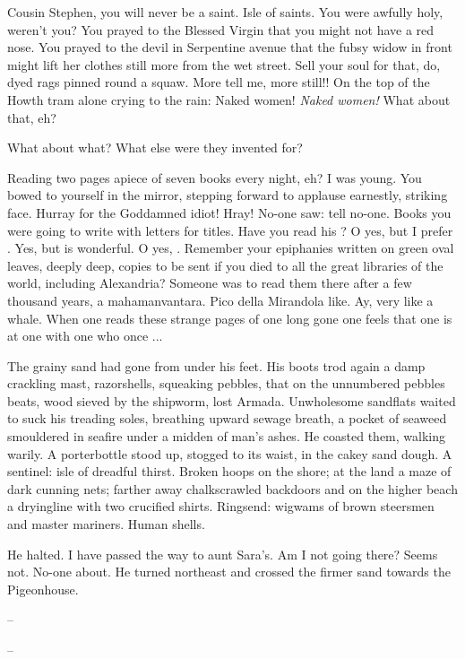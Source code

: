 Cousin Stephen, you will never be a saint.
Isle of saints.
You were awfully holy, weren't you?
You prayed to the Blessed Virgin
that you might not have a red nose.
You prayed to the devil in Serpentine avenue
that the fubsy widow in front might lift her clothes
still more from the wet street.
Sell your soul for that, do, dyed rags pinned round a squaw.
More tell me, more still!!
On the top of the Howth tram alone crying to the rain:
Naked women!
\emph{Naked women!}
What about that, eh?

What about what?
What else were they invented for?

Reading two pages apiece of seven books every night, eh?
I was young.
You bowed to yourself in the mirror,
stepping forward to applause earnestly, striking face.
Hurray for the Goddamned idiot!
Hray!
No-one saw:
tell no-one.
Books you were going to write with letters for titles.
Have you read his ?
O yes, but I prefer .
Yes, but  is wonderful.
O yes, .
Remember your epiphanies written on green oval leaves,
deeply deep,
copies to be sent if you died to all the great libraries of the world,
including Alexandria?
Someone was to read them there after a few thousand years,
a mahamanvantara.
Pico della Mirandola like.
Ay, very like a whale.
When one reads these strange pages of one long gone
one feels that one is at one with one who once ...

The grainy sand had gone from under his feet.
His boots trod again a damp crackling mast,
razorshells, squeaking pebbles,
that on the unnumbered pebbles beats,
wood sieved by the shipworm,
lost Armada.
Unwholesome sandflats waited to suck his treading soles,
breathing upward sewage breath,
a pocket of seaweed smouldered in seafire under a midden of man's ashes.
He coasted them, walking warily.
A porterbottle stood up,
stogged to its waist, in the cakey sand dough.
A sentinel:
isle of dreadful thirst.
Broken hoops on the shore;
at the land a maze of dark cunning nets;
farther away chalkscrawled backdoors
and on the higher beach
a dryingline with two crucified shirts.
Ringsend:
wigwams of brown steersmen and master mariners.
Human shells.

He halted.
I have passed the way to aunt Sara's.
Am I not going there?
Seems not.
No-one about.
He turned northeast and crossed the firmer sand towards the Pigeonhouse.

--

--

